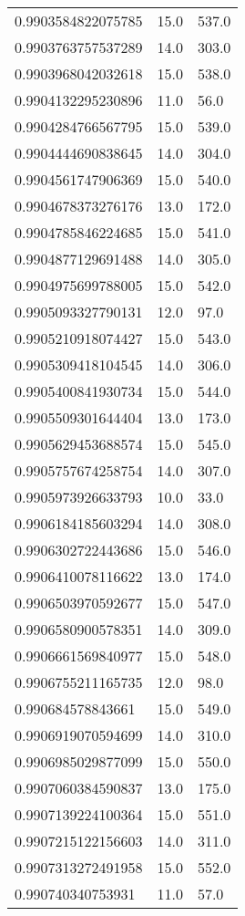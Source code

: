 \begin{center}
\begin{supertabular}[H]{p{0.30\textwidth}p{0.05\textwidth}p{0.05\textwidth}}
0.9903584822075785 & 15.0 & 537.0 \\ 
0.9903763757537289 & 14.0 & 303.0 \\ 
0.9903968042032618 & 15.0 & 538.0 \\ 
0.9904132295230896 & 11.0 & 56.0 \\ 
0.9904284766567795 & 15.0 & 539.0 \\ 
0.9904444690838645 & 14.0 & 304.0 \\ 
0.9904561747906369 & 15.0 & 540.0 \\ 
0.9904678373276176 & 13.0 & 172.0 \\ 
0.9904785846224685 & 15.0 & 541.0 \\ 
0.9904877129691488 & 14.0 & 305.0 \\ 
0.9904975699788005 & 15.0 & 542.0 \\ 
0.9905093327790131 & 12.0 & 97.0 \\ 
0.9905210918074427 & 15.0 & 543.0 \\ 
0.9905309418104545 & 14.0 & 306.0 \\ 
0.9905400841930734 & 15.0 & 544.0 \\ 
0.9905509301644404 & 13.0 & 173.0 \\ 
0.9905629453688574 & 15.0 & 545.0 \\ 
0.9905757674258754 & 14.0 & 307.0 \\ 
0.9905973926633793 & 10.0 & 33.0 \\ 
0.9906184185603294 & 14.0 & 308.0 \\ 
0.9906302722443686 & 15.0 & 546.0 \\ 
0.9906410078116622 & 13.0 & 174.0 \\ 
0.9906503970592677 & 15.0 & 547.0 \\ 
0.9906580900578351 & 14.0 & 309.0 \\ 
0.9906661569840977 & 15.0 & 548.0 \\ 
0.9906755211165735 & 12.0 & 98.0 \\ 
0.990684578843661 & 15.0 & 549.0 \\ 
0.9906919070594699 & 14.0 & 310.0 \\ 
0.9906985029877099 & 15.0 & 550.0 \\ 
0.9907060384590837 & 13.0 & 175.0 \\ 
0.9907139224100364 & 15.0 & 551.0 \\ 
0.9907215122156603 & 14.0 & 311.0 \\ 
0.9907313272491958 & 15.0 & 552.0 \\ 
0.990740340753931 & 11.0 & 57.0 \\ 

\end{supertabular}
\end{center}
